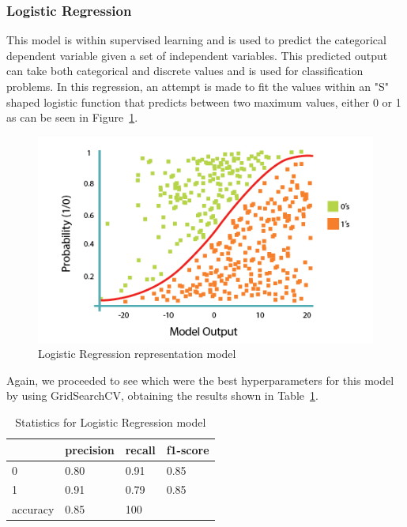 \subsubsection{Logistic Regression}
This model is within supervised learning and is used to predict the categorical dependent variable given a set of independent variables. This predicted output can take both categorical and discrete values and is used for classification problems. In this regression, an attempt is made to fit the values within an "S" shaped logistic function that predicts between two maximum values, either 0 or 1 as can be seen in Figure~\ref{fig:LogisticRegression}.

\begin{figure}[!htp]
    \centering
    \includegraphics[scale=0.6]{img/detection/LogisticRegression.png}
    \caption{Logistic Regression representation model}
    \label{fig:LogisticRegression}
\end{figure}

Again, we proceeded to see which were the best hyperparameters for this model by using GridSearchCV, obtaining the results shown in Table~\ref{tab:LogisticRegressionStatistics}.



\begin{table}[!htp]
\centering
\begin{tabular}{|l|l|l|l|}
\hline
         & precision & recall & f1-score \\ \hline
0        & 0.80      & 0.91   & 0.85     \\ \hline
1        & 0.91      & 0.79   & 0.85     \\ \hline
accuracy & 0.85      & 100    &          \\ \hline
\end{tabular}
\caption{Statistics for Logistic Regression model}
\label{tab:LogisticRegressionStatistics}
\end{table}

